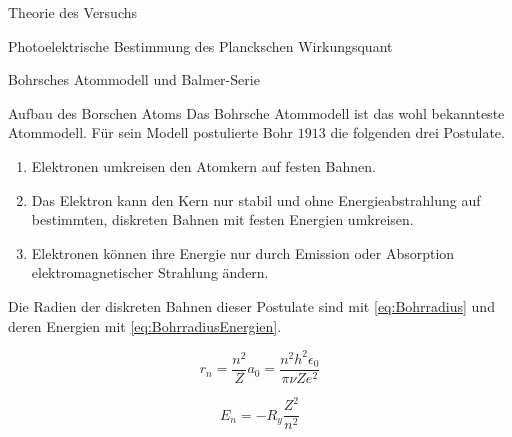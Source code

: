 \documentclass[pdftex, a4paper,11pt, twoside, ngerman]{report}
\begin{document}
\begin{chapter}{Theorie des Versuchs}
\begin{section}{Photoelektrische Bestimmung des Planckschen Wirkungsquant}
    \end{section}
   
   
   
    \begin{section}{Bohrsches Atommodell und Balmer-Serie}
      \label{chp:TheorieBohrBalmerSerie}
     
     
     
      \begin{subsection}{Aufbau des Borschen Atoms}
        \label{chp:TheorieBohrBalmerSerieAufbauAtomhuelle}
        Das Bohrsche Atommodell ist das wohl bekannteste Atommodell. Für sein
        Modell postulierte Bohr $1913$ die folgenden drei Postulate.
        \begin{enumerate}
          \item Elektronen umkreisen den Atomkern auf festen Bahnen.
          \item Das Elektron kann den Kern nur stabil und ohne
              Energieabstrahlung auf bestimmten, diskreten Bahnen mit festen
              Energien umkreisen.
          \item Elektronen können ihre Energie nur durch Emission oder
              Absorption elektromagnetischer Strahlung ändern.
        \end{enumerate}
        Die Radien der diskreten Bahnen dieser Postulate sind mit
        \cref{eq:Bohrradius} und deren Energien mit
        \cref{eq:BohrradiusEnergien}.
        \newline
        \begin{minipage}{.48\textwidth}
          \begin{equation}
            \label{eq:Bohrradius}
            r_{n}=\frac{n^{2}}{Z}a_{0}=\frac{n^{2}h^{2}\epsilon_{0}}
                {\pi\nu Ze^{2}}
          \end{equation}
        \end{minipage}
        \begin{minipage}{.48\textwidth}
          \begin{equation}
            \label{eq:BohrradiusEnergien}
            E_{n}=-R_{y}\frac{Z^{2}}{n^{2}}
          \end{equation}
        \end{minipage}
       

\end{subsection}
\end{section}
\end{chapter}
\end{document}
